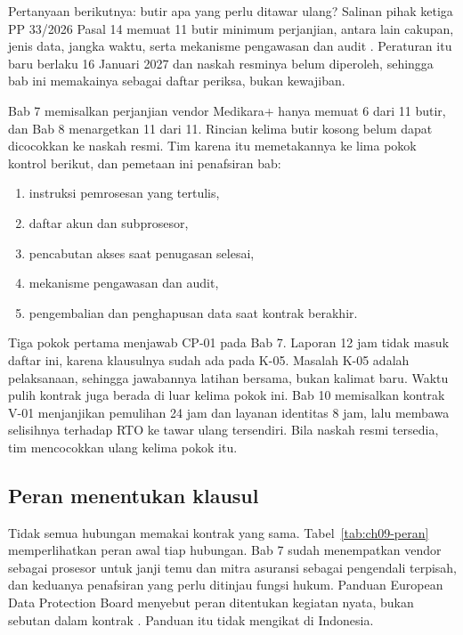 Pertanyaan berikutnya: butir apa yang perlu ditawar ulang? Salinan pihak ketiga PP 33/2026 Pasal 14
memuat 11 butir minimum perjanjian, antara lain cakupan, jenis data, jangka waktu, serta mekanisme
pengawasan dan audit \cite{c03-pp33-nonresmi,c07-rsm-pp33}. Peraturan itu baru berlaku 16 Januari
2027 dan naskah resminya belum diperoleh, sehingga bab ini memakainya sebagai daftar periksa, bukan
kewajiban.

Bab 7 memisalkan perjanjian vendor Medikara+ hanya memuat 6 dari 11 butir, dan Bab 8 menargetkan 11
dari 11. Rincian kelima butir kosong belum dapat dicocokkan ke naskah resmi. Tim karena itu
memetakannya ke lima pokok kontrol berikut, dan pemetaan ini penafsiran bab:
\begin{enumerate}
  \item instruksi pemrosesan yang tertulis,
  \item daftar akun dan subprosesor,
  \item pencabutan akses saat penugasan selesai,
  \item mekanisme pengawasan dan audit,
  \item pengembalian dan penghapusan data saat kontrak berakhir.
\end{enumerate}

Tiga pokok pertama menjawab CP-01 pada Bab 7. Laporan 12 jam tidak masuk daftar ini, karena
klausulnya sudah ada pada K-05. Masalah K-05 adalah pelaksanaan, sehingga jawabannya latihan
bersama, bukan kalimat baru. Waktu pulih kontrak juga berada di luar kelima pokok ini. Bab 10
memisalkan kontrak V-01 menjanjikan pemulihan 24 jam dan layanan identitas 8 jam, lalu membawa
selisihnya terhadap RTO ke tawar ulang tersendiri. Bila naskah resmi tersedia, tim mencocokkan ulang
kelima pokok itu.

\subsection*{Peran menentukan klausul}

Tidak semua hubungan memakai kontrak yang sama. Tabel~\ref{tab:ch09-peran} memperlihatkan peran awal
tiap hubungan. Bab 7 sudah menempatkan vendor sebagai prosesor untuk janji temu dan mitra asuransi
sebagai pengendali terpisah, dan keduanya penafsiran yang perlu ditinjau fungsi hukum. Panduan
European Data Protection Board menyebut peran ditentukan kegiatan nyata, bukan sebutan dalam kontrak
\cite{c07-edpb-roles}. Panduan itu tidak mengikat di Indonesia.


